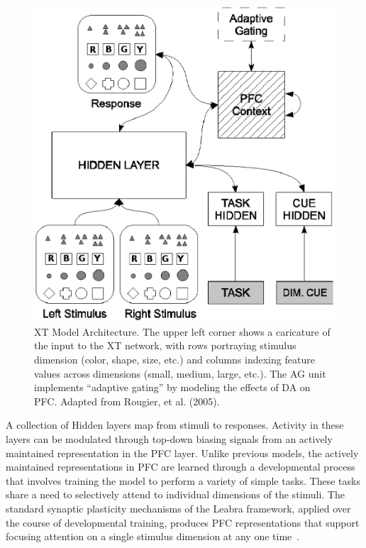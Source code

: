 \begin{figure}
\begin{center}
	\includegraphics[width=125mm]{figures/xt_arch_2.ps}
\end{center}
\caption{XT Model Architecture. The upper left corner shows a
         caricature of the input to the XT network, with rows
         portraying stimulus dimension (color, shape, size, etc.) and
         columns indexing feature values across dimensions (small,
         medium, large, etc.). The AG unit implements ``adaptive gating'' 
	 by modeling the effects of DA on PFC. Adapted from Rougier,
         et al. (2005).}
\label{xt-layout-figure}
\end{figure} 

A collection of Hidden layers map from stimuli to responses. Activity in these layers can be modulated through top-down biasing signals from an actively maintained representation in the PFC layer. Unlike previous models, the actively maintained representations in PFC are learned through a developmental process that involves training the model to perform a variety of simple tasks. These tasks share a need to selectively attend to individual dimensions of the stimuli. The standard synaptic plasticity mechanisms of the Leabra framework, applied over the course of developmental training, produces PFC representations that support focusing attention on a single stimulus dimension at any one time~\cite{RougierNP:2005:XT}.

